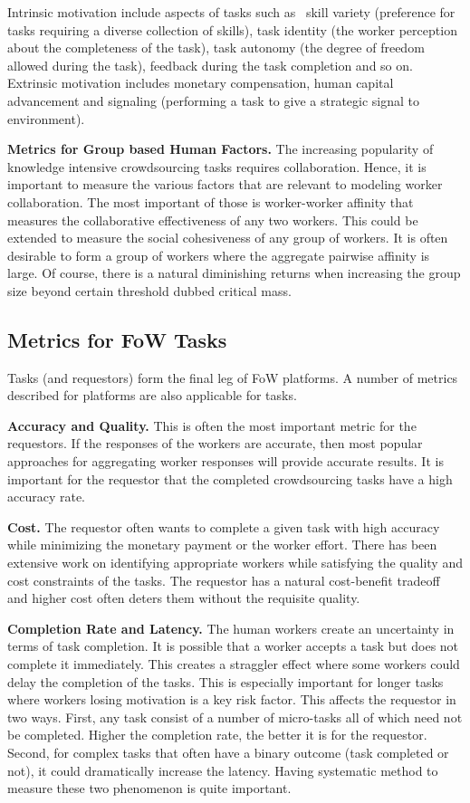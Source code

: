 Intrinsic motivation include aspects of tasks such as~\cite{kaufmann2011more}
skill variety (preference for tasks requiring a diverse collection of skills),
task identity (the worker perception about the completeness of the task),
task autonomy (the degree of freedom allowed during the task),
feedback during the task completion and so on.
Extrinsic motivation includes monetary compensation, human capital advancement and
signaling (performing a task to give a strategic signal to environment).

\textbf{Metrics for Group based Human Factors.}
The increasing popularity of knowledge intensive crowdsourcing tasks requires collaboration.
Hence, it is important to measure the various factors that are relevant to modeling worker collaboration.
The most important of those is worker-worker affinity that measures the collaborative effectiveness of any two workers. This could be extended to measure the social cohesiveness of any group of workers.
It is often desirable to form a group of workers where the aggregate pairwise affinity is large.
Of course, there is a natural diminishing returns when increasing the group size beyond certain threshold dubbed critical mass.


\subsection{Metrics for FoW Tasks}
Tasks (and requestors) form the final leg of FoW platforms.
A number of metrics described for platforms are also applicable for tasks.

\textbf{Accuracy and Quality.}
This is often the most important metric for the requestors.
If the responses of the workers are accurate, then most popular approaches for
aggregating worker responses will provide accurate results.
It is important for the requestor that the completed crowdsourcing tasks have a high accuracy rate.

\textbf{Cost.}
The requestor often wants to complete a given task with high accuracy while minimizing the monetary payment or the worker effort.
There has been extensive work on identifying appropriate workers while satisfying the quality and cost constraints of the tasks.
The requestor has a natural cost-benefit tradeoff and higher cost often deters them without the requisite quality.

\textbf{Completion Rate and Latency.}
The human workers create an uncertainty in terms of task completion.
It is possible that a worker accepts a task but does not complete it immediately.
This creates a straggler effect where some workers could delay the completion of the tasks.
This is especially important for longer tasks where workers losing motivation is a key risk factor.
This affects the requestor in two ways.
First, any task consist of a number of micro-tasks all of which need not be completed.
Higher the completion rate, the better it is for the requestor.
Second, for complex tasks that often have a binary outcome (task completed or not),
it could dramatically increase the latency.
Having systematic method to measure these two phenomenon is quite important.

